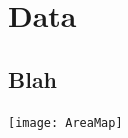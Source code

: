 \documentclass[xcolor=x11names,compress]{beamer}
\renewcommand{\(}{\begin{columns}}
\renewcommand{\)}{\end{columns}}
\newcommand{\<}[1]{\begin{column}{#1}}
\renewcommand{\>}{\end{column}}
\begin{document}

	


	










	


\section{Data}
\subsection{Blah}

\begin{frame}{}
\centering
\texttt{[image: AreaMap]}

\end{frame}
\end{document}

